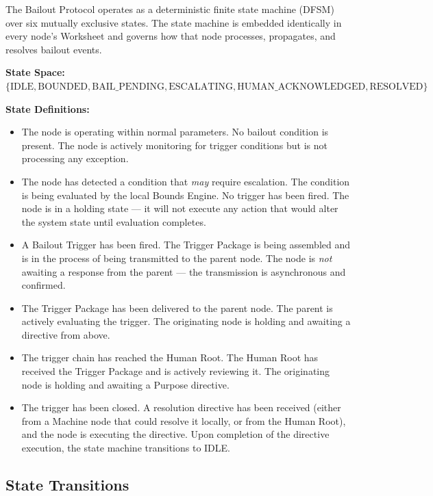 The Bailout Protocol operates as a deterministic finite state machine (DFSM) over six mutually exclusive states. The state machine is embedded identically in every node's Worksheet and governs how that node processes, propagates, and resolves bailout events.

\bigskip
\noindent\textbf{State Space:} $\{ \text{IDLE}, \text{BOUNDED}, \text{BAIL\_PENDING}, \text{ESCALATING}, \text{HUMAN\_ACKNOWLEDGED}, \text{RESOLVED} \}$

\bigskip
\noindent\textbf{State Definitions:}

\begin{itemize}
  \item[\textbf{IDLE}] The node is operating within normal parameters. No bailout condition is present. The node is actively monitoring for trigger conditions but is not processing any exception.
  \item[\textbf{BOUNDED}] The node has detected a condition that \emph{may} require escalation. The condition is being evaluated by the local Bounds Engine. No trigger has been fired. The node is in a holding state — it will not execute any action that would alter the system state until evaluation completes.
  \item[\textbf{BAIL\_PENDING}] A Bailout Trigger has been fired. The Trigger Package is being assembled and is in the process of being transmitted to the parent node. The node is \emph{not} awaiting a response from the parent — the transmission is asynchronous and confirmed.
  \item[\textbf{ESCALATING}] The Trigger Package has been delivered to the parent node. The parent is actively evaluating the trigger. The originating node is holding and awaiting a directive from above.
  \item[\textbf{HUMAN\_ACKNOWLEDGED}] The trigger chain has reached the Human Root. The Human Root has received the Trigger Package and is actively reviewing it. The originating node is holding and awaiting a Purpose directive.
  \item[\textbf{RESOLVED}] The trigger has been closed. A resolution directive has been received (either from a Machine node that could resolve it locally, or from the Human Root), and the node is executing the directive. Upon completion of the directive execution, the state machine transitions to IDLE.
\end{itemize}

\subsection{State Transitions}

